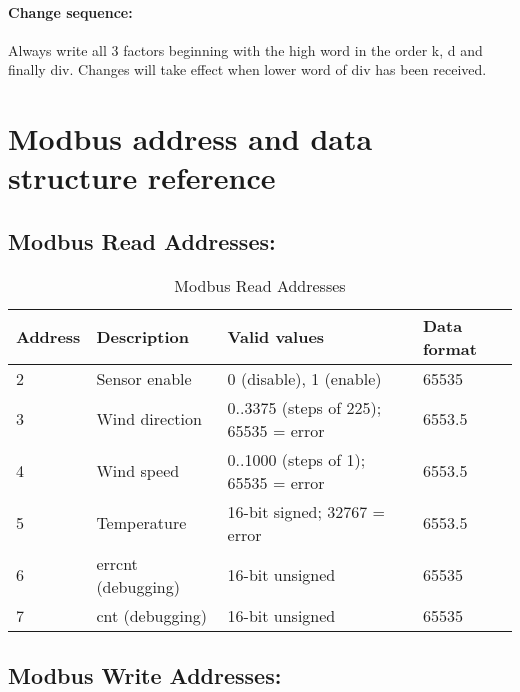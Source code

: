 \paragraph{Change sequence: }Always write all 3 factors beginning with the high word in the order k, d and finally div. Changes will take effect when lower word of div has been received.

\section{Modbus address and data structure reference}
\label{sec:modbus_address_ref}
\subsection{Modbus Read Addresses:}

\begin{table}[h]
    \centering
    \begin{tabular}{|l|l|l|l|}
    \hline \textbf{Address} & \textbf{Description} & \textbf{Valid values} & \textbf{Data format} \\ 
    \hline
    \hline 2 & Sensor enable & 0 (disable), 1 (enable) & 65535 \\ 
    \hline 3 & Wind direction & 0..3375 (steps of 225); 65535 = error & 6553.5 \\ 
    \hline 4 & Wind speed & 0..1000 (steps of 1); 65535 = error & 6553.5 \\ 
    \hline 5 & Temperature & 16-bit signed; 32767 = error & 6553.5 \\ 
    \hline 6 & errcnt (debugging) & 16-bit unsigned & 65535 \\ 
    \hline 7 & cnt (debugging) & 16-bit unsigned & 65535 \\ 
    \hline 
    \end{tabular}
    \caption{Modbus Read Addresses}
\end{table}


\subsection{Modbus Write Addresses:}

